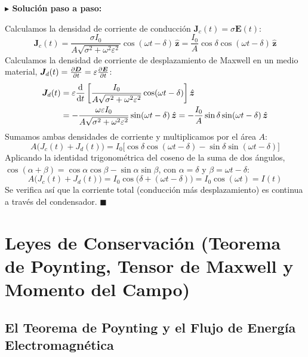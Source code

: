 \documentclass[11pt,a4paper]{book}
\newenvironment{solucion}{%
    \par\medskip\noindent\textbf{\color{blue!65!black}\Large $\blacktriangleright$ Solución paso a paso:}\par\medskip
}{%
    \hfill$\blacksquare$\par\bigskip
}
\newcommand{\zhat}{\hat{\bm{z}}}
\newcommand{\Evec}{\bm{E}}
\newcommand{\Dvec}{\bm{D}}
\newcommand{\Jvec}{\bm{J}}
\begin{document}
\begin{solucion}
Calculamos la densidad de corriente de conducción $\Jvec_c(t) = \sigma \Evec(t)$:
\begin{equation}
    \Jvec_c(t) = \frac{\sigma I_0}{A\sqrt{\sigma^2 + \omega^2\varepsilon^2}} \cos(\omega t - \delta)\,\zhat = \frac{I_0}{A} \cos\delta \cos(\omega t - \delta)\,\zhat
\end{equation}
Calculamos la densidad de corriente de desplazamiento de Maxwell en un medio material, $\Jvec_d(t) = \pdv{\Dvec}{t} = \varepsilon \pdv{\Evec}{t}$:
\begin{align}
    \Jvec_d(t) &= \varepsilon \dv{}{t}\left[ \frac{I_0}{A\sqrt{\sigma^2 + \omega^2\varepsilon^2}} \cos(\omega t - \delta) \right] \zhat \nonumber \\
    &= -\frac{\omega\varepsilon I_0}{A\sqrt{\sigma^2 + \omega^2\varepsilon^2}} \sin(\omega t - \delta)\,\zhat = -\frac{I_0}{A} \sin\delta \sin(\omega t - \delta)\,\zhat
\end{align}
Sumamos ambas densidades de corriente y multiplicamos por el área $A$:
\begin{equation}
    A\big(J_c(t) + J_d(t)\big) = I_0 \Big[ \cos\delta \cos(\omega t - \delta) - \sin\delta \sin(\omega t - \delta) \Big]
\end{equation}
Aplicando la identidad trigonométrica del coseno de la suma de dos ángulos, $\cos(\alpha + \beta) = \cos\alpha\cos\beta - \sin\alpha\sin\beta$, con $\alpha = \delta$ y $\beta = \omega t - \delta$:
\begin{equation}
    A\big(J_c(t) + J_d(t)\big) = I_0 \cos\big(\delta + (\omega t - \delta)\big) = I_0 \cos(\omega t) = I(t)
\end{equation}
Se verifica así que la corriente total (conducción más desplazamiento) es continua a través del condensador.
\end{solucion}

\chapter[Leyes de conservación]{Leyes de Conservación (Teorema de Poynting, Tensor de Maxwell y Momento del Campo)}

\section{El Teorema de Poynting y el Flujo de Energía Electromagnética}
\end{document}
